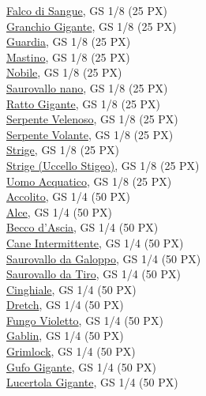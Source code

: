\begin{multicols}{3}
{\hyperlink{Falco di Sangue}{Falco di Sangue}, GS 1/8 (25 PX)\\
\hyperlink{Granchio Gigante}{Granchio Gigante}, GS 1/8 (25 PX)\\
\hyperlink{Guardia}{Guardia}, GS 1/8 (25 PX)\\
\hyperlink{Mastino}{Mastino}, GS 1/8 (25 PX)\\
\hyperlink{Nobile}{Nobile}, GS 1/8 (25 PX)\\
\hyperlink{Saurovallo nano}{Saurovallo nano}, GS 1/8 (25 PX)\\
\hyperlink{Ratto Gigante}{Ratto Gigante}, GS 1/8 (25 PX)\\
\hyperlink{Serpente Velenoso}{Serpente Velenoso}, GS 1/8 (25 PX)\\
\hyperlink{Serpente Volante}{Serpente Volante}, GS 1/8 (25 PX)\\
\hyperlink{Strige}{Strige}, GS 1/8 (25 PX)\\
\hyperlink{Strige (Uccello Stigeo)}{Strige (Uccello Stigeo)}, GS 1/8 (25 PX)\\
\hyperlink{Uomo Acquatico}{Uomo Acquatico}, GS 1/8 (25 PX)\\
\hyperlink{Accolito}{Accolito}, GS 1/4 (50 PX)\\
\hyperlink{Alce}{Alce}, GS 1/4 (50 PX)\\
\hyperlink{Becco d'Ascia}{Becco d'Ascia}, GS 1/4 (50 PX)\\
\hyperlink{Cane Intermittente}{Cane Intermittente}, GS 1/4 (50 PX)\\
\hyperlink{Saurovallo da Galoppo}{Saurovallo da Galoppo}, GS 1/4 (50 PX)\\
\hyperlink{Saurovallo da Tiro}{Saurovallo da Tiro}, GS 1/4 (50 PX)\\
\hyperlink{Cinghiale}{Cinghiale}, GS 1/4 (50 PX)\\
\hyperlink{Dretch}{Dretch}, GS 1/4 (50 PX)\\
\hyperlink{Fungo Violetto}{Fungo Violetto}, GS 1/4 (50 PX)\\
\hyperlink{Gablin}{Gablin}, GS 1/4 (50 PX)\\
\hyperlink{Grimlock}{Grimlock}, GS 1/4 (50 PX)\\
\hyperlink{Gufo Gigante}{Gufo Gigante}, GS 1/4 (50 PX)\\
\hyperlink{Lucertola Gigante}{Lucertola Gigante}, GS 1/4 (50 PX)\\
}
\end{multicols}

